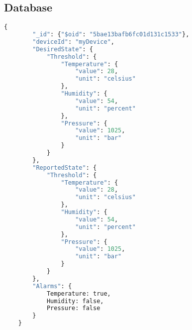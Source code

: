 \subsection{Database}

\begin{lstlisting}[language=Python, caption=Device Twin, label={lst:twin}, basicstyle=\tiny]
    {
        "_id": {"$oid": "5bae13bafb6fc01d131c1533"}, 
        "deviceId": "myDevice", 
        "DesiredState": {
            "Threshold": {
                "Temperature": {
                    "value": 28, 
                    "unit": "celsius"
                }, 
                "Humidity": {
                    "value": 54, 
                    "unit": "percent"
                }, 
                "Pressure": {
                    "value": 1025, 
                    "unit": "bar"
                }
            }
        }, 
        "ReportedState": {
            "Threshold": {
                "Temperature": {
                    "value": 28, 
                    "unit": "celsius"
                }, 
                "Humidity": {
                    "value": 54, 
                    "unit": "percent"
                }, 
                "Pressure": {
                    "value": 1025, 
                    "unit": "bar"
                }
            }
        }, 
        "Alarms": {
            Temperature: true,
            Humidity: false,
            Pressure: false
        }
    } 
\end{lstlisting}